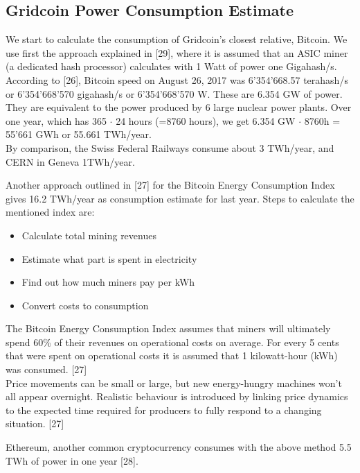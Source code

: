 \subsection{Gridcoin Power Consumption Estimate}

We start to calculate the consumption of Gridcoin's closest relative, Bitcoin. 
We use first the approach explained in [29], where it is assumed that an ASIC miner (a dedicated hash processor) calculates with 1 Watt of power one Gigahash/s. According to [26], Bitcoin speed on August 26, 2017 was 6'354'668.57 terahash/s or 6'354'668'570 gigahash/s or 6'354'668'570 W. These are 6.354 GW of power. They are equivalent to the power produced by 6 large nuclear power plants. Over one year, which has 365 $\cdot$ 24 hours (=8760 hours), we get 6.354 GW $\cdot$ 8760h = 55'661 GWh or 55.661 TWh/year.\\ 

By comparison, the Swiss Federal Railways consume about 3 TWh/year, and CERN in Geneva 1TWh/year.

Another approach outlined in [27] for the Bitcoin Energy Consumption Index gives 16.2 TWh/year as consumption estimate for last year. Steps to calculate the mentioned index are:\\

\begin{itemize}
	\item Calculate total mining revenues
	\item Estimate what part is spent in electricity
	\item Find out how much miners pay per kWh
	\item Convert costs to consumption
\end{itemize}

The Bitcoin Energy Consumption Index assumes that miners will ultimately spend 60\% of their revenues on operational costs on average. For every 5 cents that were spent on operational costs it is assumed that 1 kilowatt-hour (kWh) was consumed. [27]\\

Price movements can be small or large, but new energy-hungry machines won't all appear overnight. Realistic behaviour is introduced by linking price dynamics to the expected time required for producers to fully respond to a changing situation. [27]

Ethereum, another common cryptocurrency consumes with the above method 5.5 TWh of power in one year [28].\\

